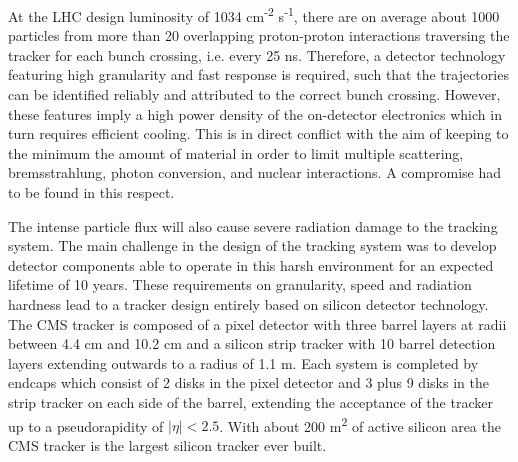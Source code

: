 At the LHC design luminosity of 1034 cm\textsuperscript{-2} s\textsuperscript{-1},
there are on average about 1000 particles from more than 20 overlapping proton-proton interactions traversing
the tracker for each bunch crossing, i.e. every 25 ns. Therefore, a detector technology featuring high
granularity and fast response is required, such that the trajectories can be identified reliably and
attributed to the correct bunch crossing. However, these features imply a high power density of
the on-detector electronics which in turn requires efficient cooling. This is in direct conflict with
the aim of keeping to the minimum the amount of material in order to limit multiple scattering,
bremsstrahlung, photon conversion, and nuclear interactions. A compromise had to be found in this
respect.

The intense particle flux will also cause severe radiation damage to the tracking system.
The main challenge in the design of the tracking system was to develop detector components able
to operate in this harsh environment for an expected lifetime of 10 years. These requirements on
granularity, speed and radiation hardness lead to a tracker design entirely based on silicon detector
technology. The CMS tracker is composed of a pixel detector with three barrel layers at radii
between 4.4 cm and 10.2 cm and a silicon strip tracker with 10 barrel detection layers extending
outwards to a radius of 1.1 m. Each system is completed by endcaps which consist of 2 disks in
the pixel detector and 3 plus 9 disks in the strip tracker on each side of the barrel, extending the
acceptance of the tracker up to a pseudorapidity of $|\eta| < 2.5$. With about 200 m\textsuperscript{2} of active silicon
area the CMS tracker is the largest silicon tracker ever built.


